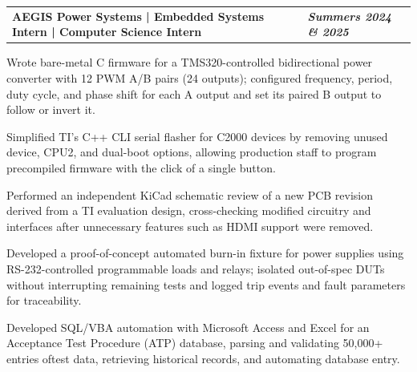 \documentclass[10pt,letterpaper]{article}
\makeatletter
\newcommand{\resumeentry}[2]{%
  \begin{tabularx}{\textwidth}{@{}X>{\raggedleft\arraybackslash}p{2.40in}@{}}
    \textbf{#1} & \textbf{\textit{#2}}
  \end{tabularx}\vspace{-0.075cm}
}
\newcommand{\descriptorentry}[1]{%
  \begin{tabularx}{\textwidth}{@{}X>{\raggedleft\arraybackslash}p{2.40in}@{}}
    \textit{#1} &
  \end{tabularx}\vspace{-0.075cm}
}
\makeatother
\begin{document}
\resumeentry{AEGIS Power Systems | Embedded Systems Intern | Computer Science Intern}{Summers 2024 \& 2025}
\begin{resumebullets}
  \item Wrote bare-metal C firmware for a TMS320-controlled bidirectional power converter with 12 PWM A/B pairs (24 outputs); configured frequency, period, duty cycle, and phase shift for each A output and set its paired B output to follow or invert it.
  \item Simplified TI's C++ CLI serial flasher for C2000 devices by removing unused device, CPU2, and dual-boot options, allowing production staff to program precompiled firmware with the click of a single button.
  
  \item Performed an independent KiCad schematic review of a new PCB revision derived from a TI evaluation design, cross-checking modified circuitry and interfaces after unnecessary features such as HDMI support were removed.
  \item Developed a proof-of-concept automated burn-in fixture for power supplies using RS-232-controlled programmable loads and relays; isolated out-of-spec DUTs without interrupting remaining tests and logged trip events and fault parameters for traceability.
  \item Developed SQL/VBA automation with Microsoft Access and Excel for an Acceptance Test Procedure (ATP) database, parsing and validating 50,000+ entries oftest data, retrieving historical records, and automating database entry.
\end{resumebullets}
\end{document}
